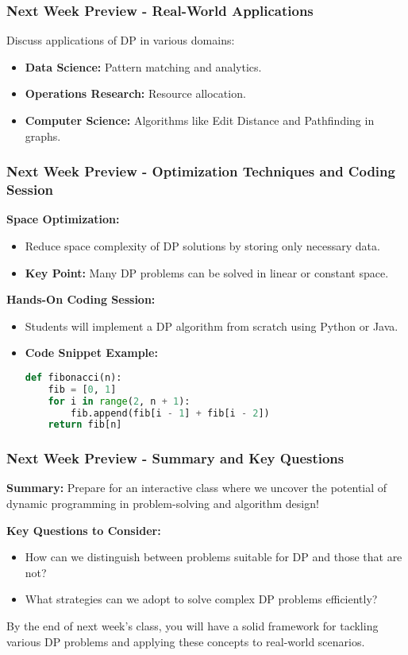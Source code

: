 \documentclass[aspectratio=169]{beamer}
\begin{document}
\begin{frame}[fragile]
  \frametitle{Next Week Preview - Real-World Applications}
  Discuss applications of DP in various domains:
  \begin{itemize}
    \item \textbf{Data Science:} Pattern matching and analytics.
    \item \textbf{Operations Research:} Resource allocation.
    \item \textbf{Computer Science:} Algorithms like Edit Distance and Pathfinding in graphs.
  \end{itemize}
\end{frame}

\begin{frame}[fragile]
  \frametitle{Next Week Preview - Optimization Techniques and Coding Session}
  \textbf{Space Optimization:}
  \begin{itemize}
    \item Reduce space complexity of DP solutions by storing only necessary data.
    \item \textbf{Key Point:} Many DP problems can be solved in linear or constant space.
  \end{itemize}

  \textbf{Hands-On Coding Session:}
  \begin{itemize}
    \item Students will implement a DP algorithm from scratch using Python or Java.
    \item \textbf{Code Snippet Example:}
    \begin{lstlisting}[language=Python]
def fibonacci(n):
    fib = [0, 1]
    for i in range(2, n + 1):
        fib.append(fib[i - 1] + fib[i - 2])
    return fib[n]
    \end{lstlisting}
  \end{itemize}
\end{frame}

\begin{frame}[fragile]
  \frametitle{Next Week Preview - Summary and Key Questions}
  \textbf{Summary:} Prepare for an interactive class where we uncover the potential of dynamic programming in problem-solving and algorithm design!

  \textbf{Key Questions to Consider:}
  \begin{itemize}
    \item How can we distinguish between problems suitable for DP and those that are not?
    \item What strategies can we adopt to solve complex DP problems efficiently?
  \end{itemize}
  
  By the end of next week’s class, you will have a solid framework for tackling various DP problems and applying these concepts to real-world scenarios.
\end{frame}
\end{document}
